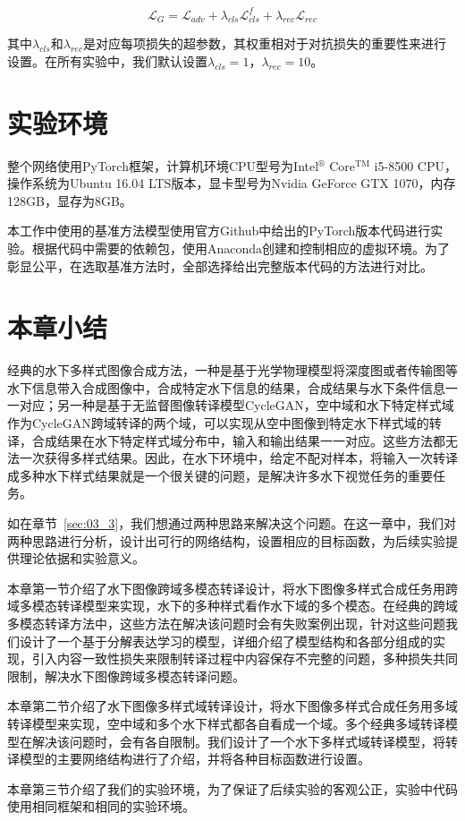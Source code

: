 \begin{equation}
\label{equ:G_exp2}
\mathcal{L}_{G} = \mathcal{L}_{adv}+\lambda_{cls}\mathcal{L}_{cls}^{f}+\lambda_{rec}\mathcal{L}_{rec}
\end{equation}

其中$\lambda_{cls}$和$\lambda_{rec}$是对应每项损失的超参数，其权重相对于对抗损失的重要性来进行设置。在所有实验中，我们默认设置$\lambda_{cls}=1$，$\lambda_{rec}=10$。


\section{实验环境}
整个网络使用PyTorch框架，计算机环境CPU型号为Intel$^\circledR$ Core$^{\text{TM}}$ i5-8500 CPU，操作系统为Ubuntu 16.04 LTS版本，显卡型号为Nvidia GeForce GTX 1070，内存128GB，显存为8GB。

本工作中使用的基准方法模型使用官方Github中给出的PyTorch版本代码进行实验。根据代码中需要的依赖包，使用Anaconda创建和控制相应的虚拟环境。为了彰显公平，在选取基准方法时，全部选择给出完整版本代码的方法进行对比。

\section{本章小结}
经典的水下多样式图像合成方法，一种是基于光学物理模型将深度图或者传输图等水下信息带入合成图像中，合成特定水下信息的结果，合成结果与水下条件信息一一对应；另一种是基于无监督图像转译模型CycleGAN，空中域和水下特定样式域作为CycleGAN跨域转译的两个域，可以实现从空中图像到特定水下样式域的转译，合成结果在水下特定样式域分布中，输入和输出结果一一对应。这些方法都无法一次获得多样式结果。因此，在水下环境中，给定不配对样本，将输入一次转译成多种水下样式结果就是一个很关键的问题，是解决许多水下视觉任务的重要任务。

如在章节~\ref{sec:03_3}，我们想通过两种思路来解决这个问题。在这一章中，我们对两种思路进行分析，设计出可行的网络结构，设置相应的目标函数，为后续实验提供理论依据和实验意义。

{}本章第一节介绍了水下图像跨域多模态转译设计，将水下图像多样式合成任务用跨域多模态转译模型来实现，水下的多种样式看作水下域的多个模态。在经典的跨域多模态转译方法中，这些方法在解决该问题时会有失败案例出现，针对这些问题我们设计了一个基于分解表达学习的模型，详细介绍了模型结构和各部分组成的实现，引入内容一致性损失来限制转译过程中内容保存不完整的问题，多种损失共同限制，解决水下图像跨域多模态转译问题。

本章第二节介绍了水下图像多样式域转译设计，将水下图像多样式合成任务用多域转译模型来实现，空中域和多个水下样式都各自看成一个域。多个经典多域转译模型在解决该问题时，会有各自限制。我们设计了一个水下多样式域转译模型，将转译模型的主要网络结构进行了介绍，并将各种目标函数进行设置。

本章第三节介绍了我们的实验环境，为了保证了后续实验的客观公正，实验中代码使用相同框架和相同的实验环境。
